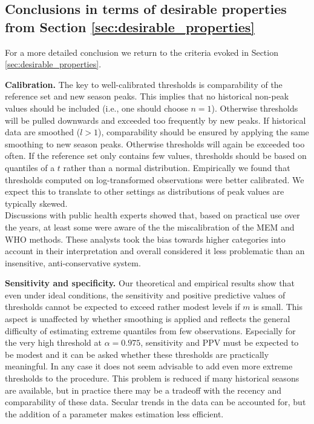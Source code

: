 \documentclass[12pt]{article}
\begin{document}
\subsection{Conclusions in terms of desirable properties from Section \ref{sec:desirable_properties}}

For a more detailed conclusion we return to the criteria evoked in Section \ref{sec:desirable_properties}.

\begin{description}
\item \textbf{Calibration.} The key to well-calibrated thresholds is comparability of the reference set and new season peaks. This implies that no historical non-peak values should be included (i.e., one should choose $n = 1$). Otherwise thresholds will be pulled downwards and exceeded too frequently by new peaks. If historical data are smoothed ($l > 1$), comparability should be ensured by applying the same smoothing to new season peaks. Otherwise thresholds will again be exceeded too often. If the reference set only contains few values, thresholds should be based on quantiles of a $t$ rather than a normal distribution. Empirically we found that thresholds computed on log-transformed observations were better calibrated. We expect this to translate to other settings as distributions of peak values are typically skewed.\\
Discussions with public health experts showed that, based on practical use over the years, at least some were aware of the the miscalibration of the MEM and WHO methods. These analysts took the bias towards higher categories into account in their interpretation and overall considered it less problematic than an insensitive, anti-conservative system.
\item \textbf{Sensitivity and specificity.} Our theoretical and empirical results show that even under ideal conditions, the sensitivity and positive predictive values of thresholds cannot be expected to exceed rather modest levels if $m$ is small. This aspect is unaffected by whether smoothing is applied and reflects the general difficulty of estimating extreme quantiles from few observations. Especially for the very high threshold at $\alpha = 0.975$, sensitivity and PPV must be expected to be modest and it can be asked whether these thresholds are practically meaningful. In any case it does not seem advisable to add even more extreme thresholds to the procedure. This problem is reduced if many historical seasons are available, but in practice there may be a tradeoff with the recency and comparability of these data. Secular trends in the data can be accounted for, but the addition of a parameter makes estimation less efficient. %

\end{description}
\end{document}
